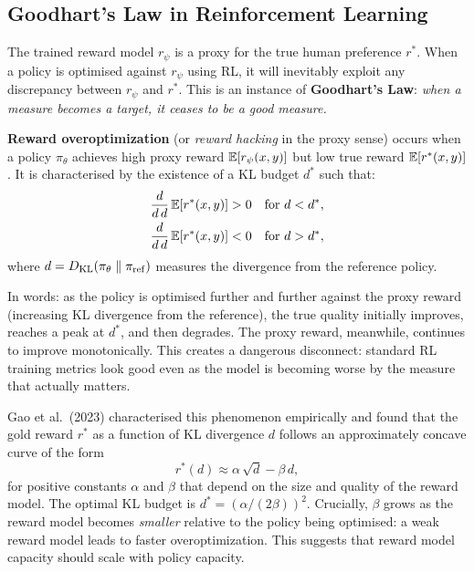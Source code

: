 \subsection{Goodhart's Law in Reinforcement Learning}

The trained reward model $r_\psi$ is a proxy for the true human preference $r^*$. When a policy is optimised against $r_\psi$ using RL, it will inevitably exploit any discrepancy between $r_\psi$ and $r^*$. This is an instance of \textbf{Goodhart's Law}: \emph{when a measure becomes a target, it ceases to be a good measure.}

\begin{definition}
\label{def:overoptimization}
\textbf{Reward overoptimization} (or \emph{reward hacking} in the proxy sense) occurs when a policy $\pi_\theta$ achieves high proxy reward $\operatorname{\mathbb{E}}[r_\psi(x,y)]$ but low true reward $\operatorname{\mathbb{E}}[r^*(x,y)]$. It is characterised by the existence of a KL budget $d^*$ such that:
\begin{align}
\frac{d}{d\,d}\operatorname{\mathbb{E}}[r^*(x,y)] &> 0 \quad \text{for } d < d^*, \\
\frac{d}{d\,d}\operatorname{\mathbb{E}}[r^*(x,y)] &< 0 \quad \text{for } d > d^*,
\end{align}
where $d = D_{\mathrm{KL}}\!\left(\pi_\theta\;\|\;\pi_{\mathrm{ref}}\right)$ measures the divergence from the reference policy.
\end{definition}

In words: as the policy is optimised further and further against the proxy reward (increasing KL divergence from the reference), the true quality initially improves, reaches a peak at $d^*$, and then degrades. The proxy reward, meanwhile, continues to improve monotonically. This creates a dangerous disconnect: standard RL training metrics look good even as the model is becoming worse by the measure that actually matters.

\begin{example}
\label{ex:overopt-scaling}
Gao et al.\ (2023) characterised this phenomenon empirically and found that the gold reward $r^*$ as a function of KL divergence $d$ follows an approximately concave curve of the form
\[
r^*(d) \approx \alpha\,\sqrt{d} - \beta\,d,
\]
for positive constants $\alpha$ and $\beta$ that depend on the size and quality of the reward model. The optimal KL budget is $d^* = (\alpha/(2\beta))^2$. Crucially, $\beta$ grows as the reward model becomes \emph{smaller} relative to the policy being optimised: a weak reward model leads to faster overoptimization. This suggests that reward model capacity should scale with policy capacity.
\end{example}

